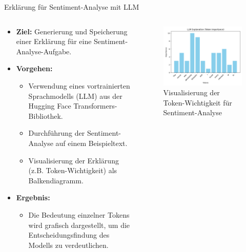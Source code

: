 \documentclass[aspectratio=1610, xcolor=dvipsnames, 9pt]{beamer}
\begin{document}
\begin{frame}{Erklärung für Sentiment-Analyse mit LLM}
  \begin{columns}
    \begin{column}{0.6\textwidth}
      \begin{itemize}
        \item \textbf{Ziel:} Generierung und Speicherung einer Erklärung für eine Sentiment-Analyse-Aufgabe.
        \item \textbf{Vorgehen:}
        \begin{itemize}
          \item Verwendung eines vortrainierten Sprachmodells (LLM) aus der Hugging Face Transformers-Bibliothek.
          \item Durchführung der Sentiment-Analyse auf einem Beispieltext.
          \item Visualisierung der Erklärung (z.B. Token-Wichtigkeit) als Balkendiagramm.
        \end{itemize}
        \item \textbf{Ergebnis:} 
        \begin{itemize}
          \item Die Bedeutung einzelner Tokens wird grafisch dargestellt, um die Entscheidungsfindung des Modells zu verdeutlichen.
        \end{itemize}
      \end{itemize}
    \end{column}
    \begin{column}{0.4\textwidth}
      \begin{figure}
        \centering
        \includegraphics[width=\textwidth]{images/sentiment_explanation.png}
        \caption{Visualisierung der Token-Wichtigkeit für Sentiment-Analyse}
      \end{figure}
    \end{column}
  \end{columns}
\end{frame}
\end{document}
